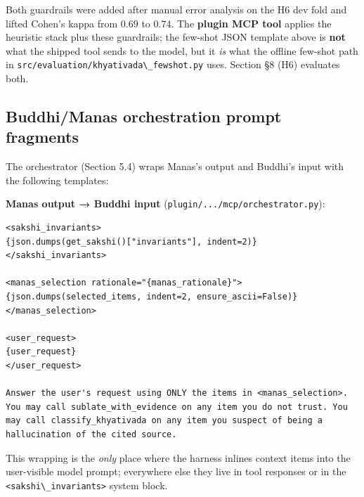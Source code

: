 Both guardrails were added after manual error analysis on the H6
dev fold and lifted Cohen's kappa from \(0.69\) to \(0.74\). The \textbf{plugin MCP tool} applies the heuristic stack plus these guardrails; the few-shot JSON template above is \textbf{not} what the shipped tool sends to the model, but it \emph{is} what the offline few-shot path in \passthrough{\lstinline!src/evaluation/khyativada\_fewshot.py!} uses. Section §8 (H6) evaluates both.

\subsection{Buddhi/Manas orchestration prompt fragments}\label{buddhimanas-orchestration-prompt-fragments}

The orchestrator (Section 5.4) wraps Manas's output and Buddhi's input
with the following templates:

\textbf{Manas output → Buddhi input} (\passthrough{\lstinline!plugin/.../mcp/orchestrator.py!}):

\begin{lstlisting}
<sakshi_invariants>
{json.dumps(get_sakshi()["invariants"], indent=2)}
</sakshi_invariants>

<manas_selection rationale="{manas_rationale}">
{json.dumps(selected_items, indent=2, ensure_ascii=False)}
</manas_selection>

<user_request>
{user_request}
</user_request>

Answer the user's request using ONLY the items in <manas_selection>.
You may call sublate_with_evidence on any item you do not trust. You
may call classify_khyativada on any item you suspect of being a
hallucination of the cited source.
\end{lstlisting}

This wrapping is the \emph{only} place where the harness inlines context items
into the user-visible model prompt; everywhere else they live in tool
responses or in the \passthrough{\lstinline!<sakshi\_invariants>!} system block.
